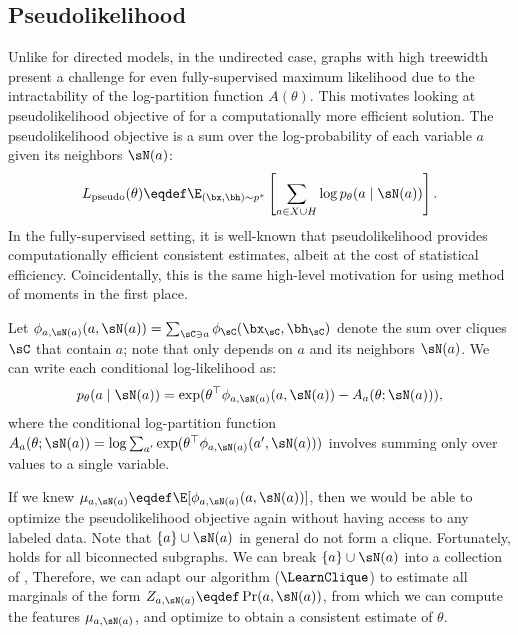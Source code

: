 \subsection{Pseudolikelihood}
\label{sec:pseudolikelihood}

Unlike for directed models, in the undirected case,
graphs with high treewidth present a challenge
for even fully-supervised maximum likelihood due to the intractability of the log-partition function $A(\theta)$.
This motivates looking at pseudolikelihood objective of \citep{besag75pseudo} for a computationally more
efficient solution.
The pseudolikelihood objective is a sum over the log-probability of each variable $a$ given its neighbors $\sN(a)$:
\begin{align}
  \label{eqn:pseudolikelihood}
L_\text{pseudo}(\theta) \eqdef \E_{(\bx,\bh) \sim p^*}\left[\sum_{a \in X \cup H} \log p_\theta(a \mid \sN(a))\right].
\end{align}
In the fully-supervised setting, it is well-known that pseudolikelihood provides computationally efficient consistent estimates,
albeit at the cost of statistical efficiency.
Coincidentally, this is the same high-level motivation for using method of moments in the first place.

Let $\phi_{a,\sN(a)}(a, \sN(a)) = \sum_{\sC \ni a} \phi_\sC(\bx_\sC,\bh_\sC)$
denote the sum over cliques $\sC$ that contain $a$; note that only depends on $a$ and its neighbors $\sN(a)$.
We can write each conditional log-likelihood as:
\begin{align}
p_\theta(a \mid \sN(a)) = \exp(\theta^\top\phi_{a,\sN(a)}(a, \sN(a)) - A_a(\theta; \sN(a))),
\end{align}
where the conditional log-partition function $A_a(\theta; \sN(a)) = \log \sum_{a'} \exp(\theta^\top\phi_{a,\sN(a)}(a', \sN(a)))$
involves summing only over values to a single variable.

If we knew $\mu_{a,\sN(a)} \eqdef \E[\phi_{a,\sN(a)}(a,\sN(a))]$,
then we would be able to optimize the pseudolikelihood objective again without
having access to any labeled data.
Note that $\{a\}\cup\sN(a)$ in general do not form a clique.
Fortunately,  holds for all biconnected subgraphs.
We can break $\{a\}\cup\sN(a)$ into a collection of 
  ,
  Therefore, we can adapt our algorithm ($\LearnClique$) to estimate all marginals of the form $Z_{a,\sN(a)} \eqdef \Pr(a,\sN(a))$,
  from which we can compute the features $\mu_{a,\sN(a)}$,
  and optimize  to obtain a consistent estimate of $\theta$.

